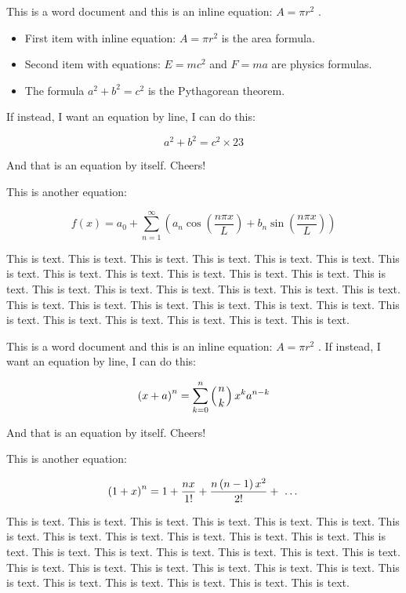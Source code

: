 \documentclass[11pt,a4paper]{article}
\begin{document}
This is a word document and this is an inline equation: $A= \pi r^{2}$ .

\begin{itemize}
\item First item with inline equation: $A= \pi r^{2}$ is the area formula.
\item Second item with equations: $E=mc^{2}$ and $F=ma$ are physics formulas.
\item The formula $a^{2}+b^{2}=c^{2}$ is the Pythagorean theorem.
\end{itemize}

If instead, I want an equation by line, I can do this:

$$a^{2}+b^{2}=c^{2} \times 23$$

And that is an equation by itself. Cheers!

This is another equation:

$$f\left(x\right)=a_{0}+\sum_{n=1}^{ \infty }\left(a_{n}\cos(\frac{n \pi x}{L})+b_{n}\sin(\frac{n \pi x}{L})\right)$$

This is text. This is text. This is text. This is text. This is text. This is text. This is text. This is text. This is text. This is text. This is text. This is text. This is text. This is text. This is text. This is text. This is text. This is text. This is text. This is text. This is text. This is text. This is text. This is text. This is text. This is text. This is text. This is text. This is text. This is text. This is text.

This is a word document and this is an inline equation: $A= \pi r^{2}$ . If instead, I want an equation by line, I can do this:

$$\left(x+a\right)^{n}=\sum_{k=0}^{n}\left(\genfrac{}{}{0pt}{}{n}{k}\right)x^{k}a^{n-k}$$

And that is an equation by itself. Cheers!

This is another equation:

$$\left(1+x\right)^{n}=1+\frac{nx}{1!}+\frac{n\left(n-1\right)x^{2}}{2!}+ \text{ \textellipsis }$$

This is text. This is text. This is text. This is text. This is text. This is text. This is text. This is text. This is text. This is text. This is text. This is text. This is text. This is text. This is text. This is text. This is text. This is text. This is text. This is text. This is text. This is text. This is text. This is text. This is text. This is text. This is text. This is text. This is text. This is text. This is text.
\end{document}
